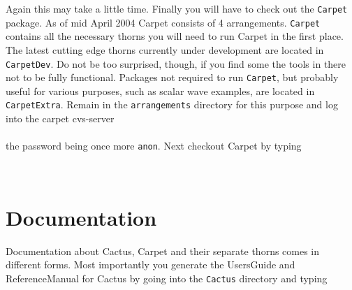 \documentclass[11pt]{article}
\numberwithin{equation}{section}
\begin{document}
Again this may take a little time. Finally you will have to check out the
{\tt Carpet} package. As of mid April 2004 Carpet consists of 4 arrangements.
{\tt Carpet} contains all the necessary thorns you will need to run Carpet
in the first place. The latest cutting edge thorns currently under
development are located in {\tt CarpetDev}. Do not be too surprised, though,
if you find some the tools in there not to be fully functional.
Packages not required to run {\tt Carpet}, but probably useful for
various purposes, such as scalar wave examples,
are located in {\tt CarpetExtra}.
%
%
Remain in the {\tt arrangements} directory for this purpose and log
into the carpet cvs-server\\

\hspace{1cm}{\tt cvs -d :pserver:cvs\_anon@cvs.carpetcode.org:/home/cvs/carpet login}\\

the password being once more {\tt anon}. Next checkout Carpet by typing\\

\hspace{1cm}{\tt cvs -d :pserver:cvs\_anon@cvs.carpetcode.org:/home/cvs/carpet checkout Carpet}

\hspace{1cm}{\tt cvs -d :pserver:cvs\_anon@cvs.carpetcode.org:/home/cvs/carpet checkout CarpetExtra}

\hspace{1cm}{\tt cvs -d :pserver:cvs\_anon@cvs.carpetcode.org:/home/cvs/carpet checkout CarpetDev}\\



\section{Documentation}

Documentation about Cactus, Carpet and their separate thorns comes
in different forms. Most importantly you generate the UsersGuide and
ReferenceManual for Cactus by going into the {\tt Cactus} directory
and typing

\hspace{1cm}{\tt make UsersGuide}\\
\end{document}
